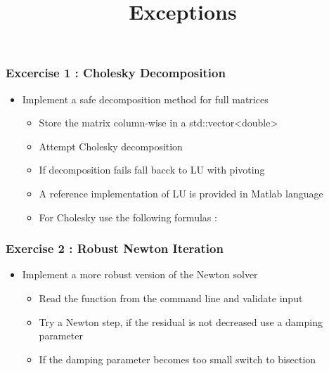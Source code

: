 \documentclass[smaller,a4paper,allowframebreaks]{beamer}
\begin{document}
\title{Exceptions}
\frame{\titlepage}

\begin{frame}
\frametitle{Excercise 1 : Cholesky Decomposition}
\begin{itemize}
\item Implement a safe decomposition method for full matrices
      \begin{itemize}
            \item Store the matrix column-wise in a std::vector<double>             
            \item Attempt Cholesky decomposition
            \item If decomposition fails fall bacck to LU with pivoting
            \item A reference implementation of LU is provided in Matlab language
            \item For Cholesky use the following formulas :
      \end{itemize}      
\end{itemize}
\end{frame}


\begin{frame}
\frametitle{Exercise 2 : Robust Newton Iteration}
\begin{itemize}
\item Implement a more robust version of the Newton solver
      \begin{itemize}
            \item Read the function from the command line and validate input
            \item Try a Newton step, if the residual is not decreased use a damping parameter
            \item If the damping parameter becomes too small switch to bisection
      \end{itemize}      
\end{itemize}

\end{frame}
\end{document}
